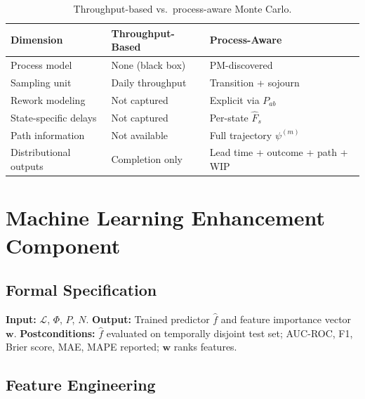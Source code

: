 \begin{table}[htbp]
\centering
\caption{Throughput-based vs.\ process-aware Monte Carlo.}
\label{tab:mc-comparison}
\begin{tabular}{lll}
\toprule
\textbf{Dimension} & \textbf{Throughput-Based} & \textbf{Process-Aware} \\
\midrule
Process model               & None (black box)    & PM-discovered \\
Sampling unit               & Daily throughput    & Transition + sojourn \\
Rework modeling             & Not captured        & Explicit via $P_{ab}$ \\
State-specific delays       & Not captured        & Per-state $\hat{F}_s$ \\
Path information            & Not available       & Full trajectory $\psi^{(m)}$ \\
Distributional outputs      & Completion only     & Lead time + outcome + path + WIP \\
\bottomrule
\end{tabular}
\end{table}


\section{Machine Learning Enhancement Component}
\label{sec:ml-component}

\subsection{Formal Specification}
\label{sec:ml-formal}

\begin{definition}
\label{def:contract-ml}
\textbf{Input:} $\mathcal{L}$, $\Phi$, $P$, $N$.
\textbf{Output:} Trained predictor $\hat{f}$ and feature importance vector
$\mathbf{w}$.
\textbf{Postconditions:} $\hat{f}$ evaluated on temporally disjoint test
set; AUC-ROC, F1, Brier score, MAE, MAPE reported; $\mathbf{w}$ ranks
features.
\end{definition}


\subsection{Feature Engineering}
\label{sec:ml-feature-eng}

